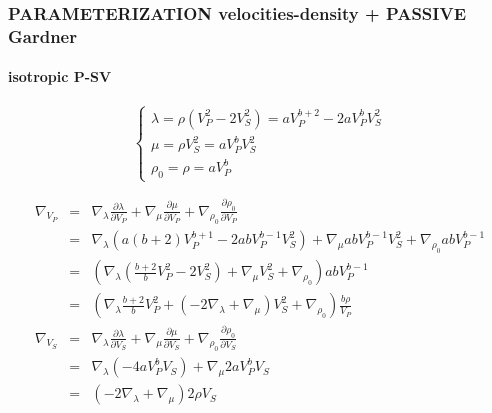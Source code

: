 \documentclass[9pt]{beamer}
\newcommand{\partderi}[2]{\frac{\partial#1}{\partial#2}}
\begin{document}
\begin{frame}\frametitle{PARAMETERIZATION velocities-density  + PASSIVE Gardner}
\framesubtitle{isotropic P-SV}

  \begin{center}
  \end{center}
  
  \begin{minipage}{\linewidth}
    \[\left\{ \begin{array}{l}
      \lambda = \rho (V_P^2-2V_S^2) = a V_P^{b+2} - 2a V_P^{b} V_S^2 \\
      \mu    = \rho V_S^2 = a V_P ^{b}V_S^2 \\
      \rho_0 = \rho = a V_P ^{b}
    \end{array} \right.\]
    
    \begin{eqnarray}
      \nabla_{V_P} &=& \nabla_\lambda \partderi{\lambda}{V_P} + \nabla_\mu \partderi{\mu}{V_P} + \nabla_{\rho_0} \partderi{\rho_0}{V_P} \nonumber\\
                   &=& \nabla_\lambda \left( a(b+2)V_P^{b+1} - 2abV_P^{b-1}V_S^2\right) + \nabla_\mu     abV_P^{b-1}V_S^2 + \nabla_{\rho_0} abV_P^{b-1} \nonumber\\
                   &=& \left( \nabla_\lambda \left( \frac{b+2}{b}V_P^2 - 2V_S^2 \right) + \nabla_\mu V_S^2 + \nabla_{\rho_0} \right)abV_P^{b-1} \nonumber\\
                   &=& \left( \nabla_\lambda \frac{b+2}{b}V_P^2 + (-2\nabla_\lambda + \nabla_\mu) V_S^2 + \nabla_{\rho_0} \right)\frac{b\rho}{V_P} \nonumber\\
      \nabla_{V_S} &=& \nabla_\lambda \partderi{\lambda}{V_S} + \nabla_\mu \partderi{\mu}{V_S} + \nabla_{\rho_0} \partderi{\rho_0}{V_S} \nonumber\\
                   &=& \nabla_\lambda (-4a V_P^{b}V_S) + \nabla_\mu 2aV_P^{b}V_S \nonumber\\
                   &=& \left(-2\nabla_\lambda + \nabla_\mu \right)2\rho V_S \nonumber
    \end{eqnarray}

  \end{minipage}
  
\end{frame}
\end{document}
